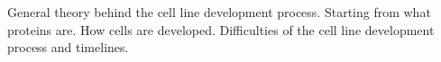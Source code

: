 General theory behind the cell line development process. Starting from what proteins are. How cells are developed. Difficulties of the cell line development process and timelines.